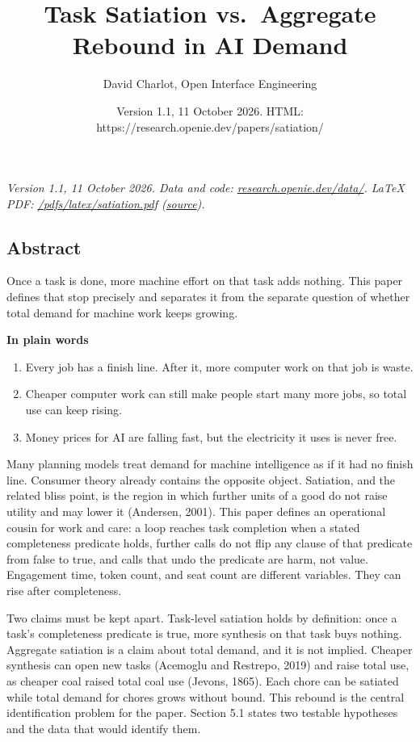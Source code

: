 \documentclass[
  10pt,
]{article}
\title{Task Satiation vs.~Aggregate Rebound in AI Demand}
\author{David Charlot, Open Interface Engineering}
\date{Version 1.1, 11 October 2026. HTML:
https://research.openie.dev/papers/satiation/}
\providecommand{\tightlist}{%
  \setlength{\itemsep}{0pt}\setlength{\parskip}{0pt}}
\begin{document}
\maketitle

{
\setcounter{tocdepth}{2}
\tableofcontents
}
\emph{Version 1.1, 11 October 2026. Data and code:
\href{https://research.openie.dev/data/\#economics}{research.openie.dev/data/}.
LaTeX PDF:
\href{https://research.openie.dev/pdfs/latex/satiation.pdf}{/pdfs/latex/satiation.pdf}
(\href{https://research.openie.dev/pdfs/latex/satiation.tex}{source}).}

\subsection{Abstract}\label{abstract}

Once a task is done, more machine effort on that task adds nothing. This
paper defines that stop precisely and separates it from the separate
question of whether total demand for machine work keeps growing.

\textbf{In plain words}

\begin{enumerate}
\def\labelenumi{\arabic{enumi}.}
\tightlist
\item
  Every job has a finish line. After it, more computer work on that job
  is waste.
\item
  Cheaper computer work can still make people start many more jobs, so
  total use can keep rising.
\item
  Money prices for AI are falling fast, but the electricity it uses is
  never free.
\end{enumerate}

Many planning models treat demand for machine intelligence as if it had
no finish line. Consumer theory already contains the opposite object.
Satiation, and the related bliss point, is the region in which further
units of a good do not raise utility and may lower it (Andersen, 2001).
This paper defines an operational cousin for work and care: a loop
reaches task completion when a stated completeness predicate holds,
further calls do not flip any clause of that predicate from false to
true, and calls that undo the predicate are harm, not value. Engagement
time, token count, and seat count are different variables. They can rise
after completeness.

Two claims must be kept apart. Task-level satiation holds by definition:
once a task's completeness predicate is true, more synthesis on that
task buys nothing. Aggregate satiation is a claim about total demand,
and it is not implied. Cheaper synthesis can open new tasks (Acemoglu
and Restrepo, 2019) and raise total use, as cheaper coal raised total
coal use (Jevons, 1865). Each chore can be satiated while total demand
for chores grows without bound. This rebound is the central
identification problem for the paper. Section 5.1 states two testable
hypotheses and the data that would identify them.
\end{document}
